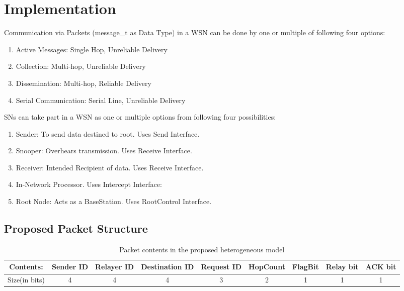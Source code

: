 \chapter{Implementation}\label{ch:implementation}

Communication via Packets (message\_t as Data Type) in a \ac{WSN} can be done by one or multiple of following four options:

\begin{enumerate}
	\item Active Messages: Single Hop, Unreliable Delivery
	\item Collection: Multi-hop, Unreliable Delivery
	\item Dissemination: Multi-hop, Reliable Delivery
	\item Serial Communication: Serial Line, Unreliable Delivery
\end{enumerate}

\acp{SN} can take part in a \acf{WSN} as one or multiple options from following four possibilities:

\begin{enumerate}
	\item Sender: To send data destined to root. Uses Send Interface.
	\item Snooper: Overhears transmission. Uses Receive Interface.
	\item Receiver: Intended Recipient of data. Uses Receive Interface.
	\item In-Network Processor. Uses Intercept Interface:
	\item Root Node: Acts as a BaseStation. Uses RootControl Interface.
\end{enumerate}

\section{Proposed Packet Structure}
\begin{table}[h]
	\caption{Packet contents in the proposed heterogeneous model} %
	\myfloatalign
	
	\begin{adjustbox}{max width=\textwidth}
		\begin{tabular}{*{9}{c}}
			\toprule
			Contents: &Sender ID  &Relayer ID &Destination ID &Request ID  &HopCount &FlagBit &Relay bit & ACK bit \\ \hline %
			\midrule
			Size(in bits) & 4 & 4 & 4 & 3 & 2 & 1 & 1 & 1 \\ \hline
			
		\end{tabular}
	\end{adjustbox}
	\label{tab:packet_structure}
\end{table}


